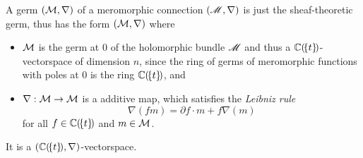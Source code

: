 \begin{comment}
  \begin{paracol}{2}\sloppy
  \switchcolumn[0]\noindent
    Let $U$ be a trivializing open set for $M$ and let
    $\textbf{e}=(e_1,\dots,e_n)$ be a basis of $\Gamma(U,\sM)$.
    There exists then a $n\times n$ matrix $A$ of meromorphic 1-forms such
    that\dots
    \begin{defn}
      This matrix is called \emph{connection matrix} for $(\sM,\nabla)$.
    \end{defn}
  \switchcolumn[1]\noindent
    Let $U$ be a neighbourhood of $0$ and $t$ a coordinate on $U$ vanishing at
    $0$.
  \end{paracol}
\end{comment}
\begin{comment}
  Some Literature like \cite{sabbah_cimpa90} always talks about germs\dots
\end{comment}
\begin{prop}
  A germ $(\mathcal{M},\nabla)$ of a meromorphic connection $(\mathscr{M},\nabla)$ is just the
  sheaf-theoretic germ, thus has the form $(\mathcal{M},\nabla)$ where
  \begin{itemize}
    \item $\mathcal{M}$ is the germ at $0$ of the holomorphic bundle $\mathscr{M}$ and thus a
      $\mathbb{C}(\!\{t\}\!)$-vectorspace of dimension $n$, since the ring of germs of
      meromorphic functions with poles at $0$ is the ring $\mathbb{C}(\!\{t\}\!)$, and
    \item $\nabla:\mathcal{M}\to \mathcal{M}$ is a additive map, which satisfies the
      \emph{Leibniz rule}
      \[
        \nabla(fm)=\partial f\cdot m + f\nabla(m)
      \]
      for all $f\in\mathbb{C}(\!\{t\}\!)$ and $m\in \mathcal{M}$.
  \end{itemize}
  \begin{rem}
    It is a $(\mathbb{C}(\!\{t\}\!),\nabla)$-vectorspace.
  \end{rem}
  \begin{comment}
    \begin{rem}
      Loday-Richaud calls this in \cite[Def.4.2.1]{Loday2014} a
      \emph{differential module}.
    \end{rem}
  \end{comment}
\end{prop}

